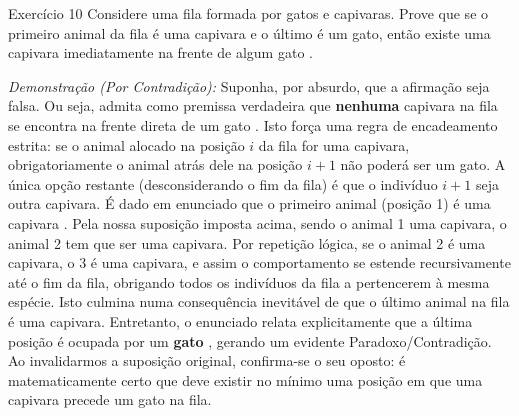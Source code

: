 \documentclass[a4paper,11pt]{article}
\theoremstyle{definition}
\theoremstyle{plain}
\theoremstyle{remark}
\newcounter{questao}[section]
\begin{document}
\newpage \begin{questaoManually}{Exercício 10}
Considere uma fila formada por gatos e capivaras. Prove que se o primeiro animal da fila é uma capivara e o último é um gato, então existe uma capivara imediatamente na frente de algum gato .

\textit{Demonstração (Por Contradição):}
Suponha, por absurdo, que a afirmação seja falsa. Ou seja, admita como premissa verdadeira que \textbf{nenhuma} capivara na fila se encontra na frente direta de um gato .
Isto força uma regra de encadeamento estrita: se o animal alocado na posição $i$ da fila for uma capivara, obrigatoriamente o animal atrás dele na posição $i+1$ não poderá ser um gato. A única opção restante (desconsiderando o fim da fila) é que o indivíduo $i+1$ seja outra capivara.
É dado em enunciado que o primeiro animal (posição 1) é uma capivara .
Pela nossa suposição imposta acima, sendo o animal 1 uma capivara, o animal 2 tem que ser uma capivara. Por repetição lógica, se o animal 2 é uma capivara, o 3 é uma capivara, e assim o comportamento se estende recursivamente até o fim da fila, obrigando todos os indivíduos da fila a pertencerem à mesma espécie.
Isto culmina numa consequência inevitável de que o último animal na fila é uma capivara. Entretanto, o enunciado relata explicitamente que a última posição é ocupada por um \textbf{gato} , gerando um evidente Paradoxo/Contradição.
Ao invalidarmos a suposição original, confirma-se o seu oposto: é matematicamente certo que deve existir no mínimo uma posição em que uma capivara precede um gato na fila. \blacksquare

\end{questaoManually}
\end{document}
